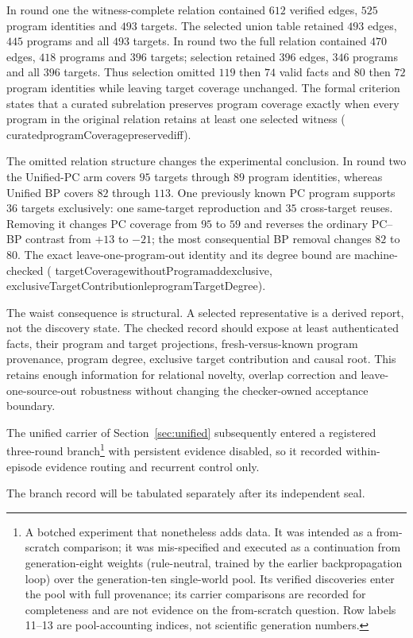 \documentclass[11pt]{article}
\newcommand{\leanname}[1]{{\scriptsize\ttfamily
  \def\_{\textunderscore\allowbreak}#1}}
\newif\ifoeisterminalfacts
\begin{document}
In round one the witness-complete relation contained $612$ verified edges, $525$
program identities and $493$ targets. The selected union table retained $493$ edges,
$445$ programs and all $493$ targets. In round two the full relation contained $470$
edges, $418$ programs and $396$ targets; selection retained $396$ edges, $346$
programs and all $396$ targets. Thus selection omitted $119$ then $74$ valid facts and
$80$ then $72$ program identities while leaving target coverage unchanged. The formal
criterion states that a curated subrelation preserves program coverage exactly when
every program in the original relation retains at least one selected witness
(\leanname{curated\_programCoverage\_preserved\_iff}).

The omitted relation structure changes the experimental conclusion. In round two the
Unified-PC arm covers $95$ targets through $89$ program identities, whereas Unified BP
covers $82$ through $113$. One previously known PC program supports $36$ targets
exclusively: one same-target reproduction and $35$ cross-target reuses. Removing it
changes PC coverage from $95$ to $59$ and reverses the ordinary PC--BP contrast from
$+13$ to $-21$; the most consequential BP removal changes $82$ to $80$. The exact
leave-one-program-out identity and its degree bound are machine-checked
(\leanname{targetCoverage\_withoutProgram\_add\_exclusive},
\leanname{exclusiveTargetContribution\_le\_programTargetDegree}).

The waist consequence is structural. A selected representative is a derived report,
not the discovery state. The checked record should expose at least authenticated facts,
their program and target projections, fresh-versus-known program provenance,
program degree, exclusive target contribution and causal root. This retains enough
information for relational novelty, overlap correction and leave-one-source-out
robustness without changing the checker-owned acceptance boundary.

The unified carrier of Section~\ref{sec:unified} subsequently entered a registered
three-round branch\footnote{A botched experiment that nonetheless adds data. It was
intended as a from-scratch comparison; it was mis-specified and executed as a
continuation from generation-eight weights (rule-neutral, trained by the earlier
backpropagation loop) over the generation-ten single-world pool. Its verified
discoveries enter the pool with full provenance; its carrier comparisons are recorded
for completeness and are not evidence on the from-scratch question. Row labels 11--13
are pool-accounting indices, not scientific generation numbers.} with persistent
evidence disabled, so it recorded within-episode evidence routing and recurrent
control only.
\ifoeisterminalfacts
The branch record is tabulated below, separately from the generation-nine/ten
factorial.
\else
The branch record will be tabulated separately after its independent seal.
\fi
\end{document}
